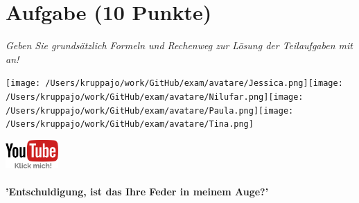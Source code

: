 \documentclass[a4paper, 9pt]{scrartcl}\usepackage[]{graphicx}\usepackage[]{xcolor}
\begin{document}

\clearpage

\section{Aufgabe \hfill (10 Punkte)}

\textit{Geben Sie grundsätzlich Formeln und Rechenweg zur Lösung der Teilaufgaben mit an!} \\[1Ex]
 

 
\ifcollection
\begin{flushright}
\tiny\vspace{-3Ex}
\textbf{\examinhaltstart}
\exammodulemathstat
\vspace{-4Ex}
\end{flushright}
\begin{minipage}[t]{0.5\textwidth}
\texttt{[image: /Users/kruppajo/work/GitHub/exam/avatare/Jessica.png]}\hspace{-4mm}\texttt{[image: /Users/kruppajo/work/GitHub/exam/avatare/Nilufar.png]}\hspace{-4mm}\texttt{[image: /Users/kruppajo/work/GitHub/exam/avatare/Paula.png]}\hspace{-4mm}\texttt{[image: /Users/kruppajo/work/GitHub/exam/avatare/Tina.png]}
\end{minipage}
\begin{minipage}[t]{0.5\textwidth}
\hfill
\href{https://youtu.be/n451XnhtSh4}{\includegraphics[width = 2cm]{img/youtube}}
\end{minipage}
\fi



\ifcollection
\paragraph{'Entschuldigung, ist das Ihre Feder in meinem Auge?'}
\fi
\end{document}
